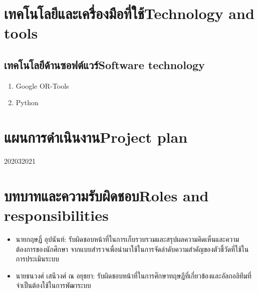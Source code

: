 \section{\ifcpe เทคโนโลยีและเครื่องมือที่ใช้\else Technology and tools\fi}


\subsection{\ifcpe เทคโนโลยีด้านซอฟต์แวร์\else Software technology\fi}
\begin{enumerate}
    \item Google OR-Tools
\iffalse   
\item Gurobi Optimizer
\fi
    \item Python
\end{enumerate}

\section{\ifcpe แผนการดำเนินงาน\else Project plan\fi}

\begin{plan}{7}{2020}{3}{2021}
\end{plan}

\section{\ifcpe บทบาทและความรับผิดชอบ\else Roles and responsibilities\fi}
\begin{itemize}
\item นายกฤษฏิ์ อุปนันท์: รับผิดชอบหน้าที่ในการเก็บรวบรวมและสรุปผลความคิดเห็นและความต้องการของนักศึกษา
จากแบบสำรวจเพื่อนำมาใช้ในการจัดลำดับความสำคัญของตัวชี้วัดที่ใช้ในการประเมินระบบ
\item นายธนวงศ์ เสนีวงศ์ ณ อยุธยา: รับผิดชอบหน้าที่ในการศึกษาทฤษฎีที่เกี่ยวข้องและอัลกอลิทึมที่จำเป็นต้องใช้ในการพัฒาระบบ
\end{itemize}

